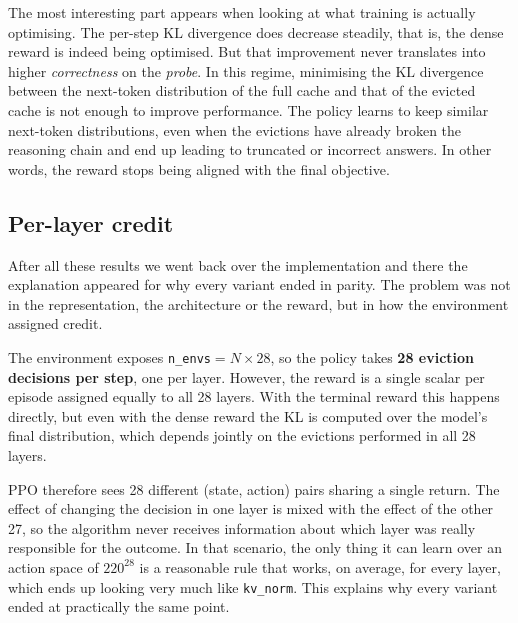 The most interesting part appears when looking at what training is actually optimising. The per-step $\mathrm{KL}$ divergence does decrease steadily, that is, the dense reward is indeed being optimised. But that improvement never translates into higher \textit{correctness} on the \textit{probe}. In this regime, minimising the $\mathrm{KL}$ divergence between the next-token distribution of the full cache and that of the evicted cache is not enough to improve performance. The policy learns to keep similar next-token distributions, even when the evictions have already broken the reasoning chain and end up leading to truncated or incorrect answers. In other words, the reward stops being aligned with the final objective.


\subsection{Per-layer credit} \label{subsec: rootcause}

After all these results we went back over the implementation and there the explanation appeared for why every variant ended in parity. The problem was not in the representation, the architecture or the reward, but in how the environment assigned credit.

The environment exposes \texttt{n\_envs}$=N\times28$, so the policy takes \textbf{28 eviction decisions per step}, one per layer. However, the reward is a single scalar per episode assigned equally to all 28 layers. With the terminal reward this happens directly, but even with the dense reward the KL is computed over the model's final distribution, which depends jointly on the evictions performed in all 28 layers.

PPO therefore sees 28 different (state, action) pairs sharing a single return. The effect of changing the decision in one layer is mixed with the effect of the other 27, so the algorithm never receives information about which layer was really responsible for the outcome. In that scenario, the only thing it can learn over an action space of $220^{28}$ is a reasonable rule that works, on average, for every layer, which ends up looking very much like \texttt{kv\_norm}. This explains why every variant ended at practically the same point.

